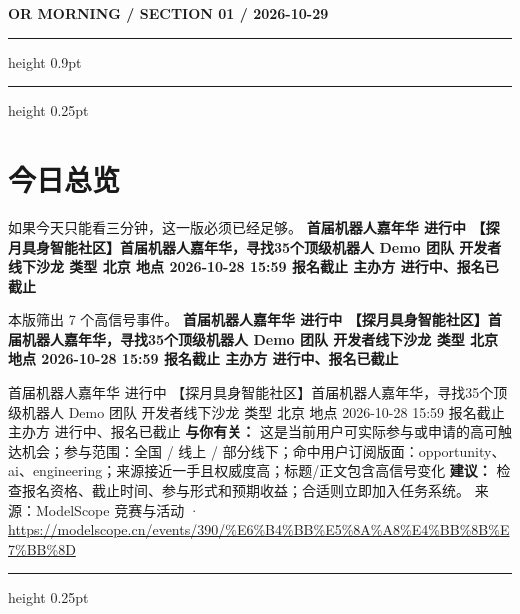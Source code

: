 \documentclass[10.5pt]{ctexart}
\begin{document}
{\small\bfseries OR MORNING / SECTION 01 / 2026-10-29}
\vspace{2mm}
\hrule height 0.9pt
\vspace{1.5mm}
\hrule height 0.25pt
\vspace{4mm}
\section*{今日总览}
{\color{ormuted} 如果今天只能看三分钟，这一版必须已经足够。}
\vspace{2mm}
{\fontsize{25}{29}\selectfont\bfseries 首届机器人嘉年华 进行中 【探月具身智能社区】首届机器人嘉年华，寻找35个顶级机器人 Demo 团队 开发者线下沙龙 类型 北京 地点 2026-10-28 15:59 报名截止 主办方 进行中、报名已截止}\par
\vspace{2mm}
{\large 本版筛出 7 个高信号事件。}
\vspace{3mm}
{\Large\bfseries 首届机器人嘉年华 进行中 【探月具身智能社区】首届机器人嘉年华，寻找35个顶级机器人 Demo 团队 开发者线下沙龙 类型 北京 地点 2026-10-28 15:59 报名截止 主办方 进行中、报名已截止}\par
首届机器人嘉年华 进行中 【探月具身智能社区】首届机器人嘉年华，寻找35个顶级机器人 Demo 团队 开发者线下沙龙 类型 北京 地点 2026-10-28 15:59 报名截止 主办方 进行中、报名已截止
\textbf{与你有关：} 这是当前用户可实际参与或申请的高可触达机会；参与范围：全国 / 线上 / 部分线下；命中用户订阅版面：opportunity、ai、engineering；来源接近一手且权威度高；标题/正文包含高信号变化
\textbf{建议：} 检查报名资格、截止时间、参与形式和预期收益；合适则立即加入任务系统。
{\footnotesize\color{ormuted} 来源：ModelScope 竞赛与活动 · \url{https://modelscope.cn/events/390/%E6%B4%BB%E5%8A%A8%E4%BB%8B%E7%BB%8D}}
\vspace{3mm}
\hrule height 0.25pt
\vspace{3mm}
\end{document}
